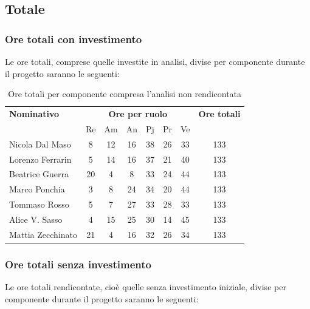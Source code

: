 \subsection{Totale}
\subsubsection{Ore totali con investimento}
Le ore totali, comprese quelle investite in analisi, divise per componente durante il progetto saranno le seguenti:

\begin{table}[H]
	\centering
	\begin{tabular}{|l|c|c|c|c|c|c|c|}
		\hline
		\textbf{Nominativo} & 
		\multicolumn{6}{c|}{\textbf{Ore per ruolo}} & 
		\textbf{Ore totali} \\
		& Re & Am & An & Pj & Pr & Ve & \\
		\hline
		Nicola Dal Maso &8 &12 &16 &38 &26 &33 & 133 \\
		Lorenzo Ferrarin &5 &14 &16 &37 &21 &40 & 133 \\
		Beatrice Guerra &20 &4 &8 &33 &24 &44 & 133 \\
		Marco Ponchia &3 &8 &24 &34 &20 &44 & 133 \\
		Tommaso Rosso &5 &7 &27 &33 &28 &33 & 133 \\
		Alice V. Sasso &4 &15 &25 &30 &14 &45 & 133 \\
		Mattia Zecchinato &21 &4 &16 &32 &26 &34 & 133 \\
		\hline
	\end{tabular}
	\caption{Ore totali per componente compresa l'analisi non rendicontata}
\end{table}

\subsubsection{Ore totali senza investimento}
Le ore totali rendicontate, cioè quelle senza investimento iniziale, divise per componente durante il progetto saranno le seguenti:

